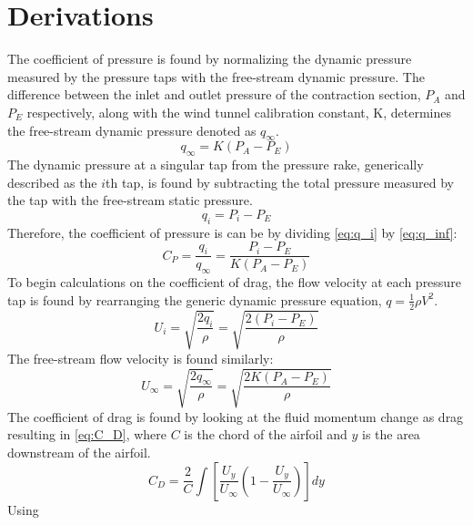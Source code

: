 \newpage
\section{Derivations}
The coefficient of pressure is found by normalizing the dynamic pressure measured by the pressure taps with the free-stream dynamic pressure. The difference between the inlet and outlet pressure of the contraction section, $P_A$ and $P_E$ respectively, along with the wind tunnel calibration constant, K, determines the free-stream dynamic pressure denoted as $q_\infty$.
\begin{equation}\label{eq:q_inf}
    q_\infty = K (P_A - P_E)
\end{equation}
The dynamic pressure at a singular tap from the pressure rake, generically described as the $i$th tap, is found by subtracting the total pressure measured by the tap with the free-stream static pressure.
\begin{equation}\label{eq:q_i}
    q_i = P_i - P_E 
\end{equation}
Therefore, the coefficient of pressure is can be by dividing \autoref{eq:q_i} by \autoref{eq:q_inf}:
\begin{equation}\label{eq:C_P}
    C_P = \frac{q_i}{q_\infty} = \frac{P_i - P_E }{K (P_A - P_E)}
\end{equation}
To begin calculations on the coefficient of drag, the flow velocity at each pressure tap is found by rearranging the generic dynamic pressure equation, $q = \frac{1}{2}\rho V^2$.
\begin{equation}\label{eq:U_i}
    U_i = \sqrt{\frac{2 q_i}{\rho}} = \sqrt{\frac{2 (P_i - P_E)}{\rho}}
\end{equation}
The free-stream flow velocity is found similarly: 
\begin{equation}\label{eq:U_inf}
    U_\infty = \sqrt{\frac{2 q_\infty}{\rho}} = \sqrt{\frac{2 K (P_A - P_E)}{\rho}}
\end{equation}
The coefficient of drag is found by looking at the fluid momentum change as drag resulting in \autoref{eq:C_D}, where $C$ is the chord of the airfoil and $y$ is the area downstream of the airfoil.
\begin{equation}\label{eq:C_D}
    C_D = \frac{2}{C} \int [\frac{U_y}{U_\infty}(1-\frac{U_y}{U_\infty})]dy
\end{equation}
Using 
